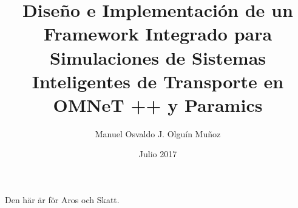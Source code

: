 \documentclass[upright, contnum]{umemoria}
\author{Manuel Osvaldo J. Olguín Muñoz}
\title{Diseño e Implementación de un Framework Integrado para Simulaciones de Sistemas Inteligentes de Transporte en OMNeT ++ y Paramics}
\date{Julio 2017}
\begin{document}
\frontmatter
\maketitle

\begin{abstract}
\lipsum[1-4]
\end{abstract}

\begin{dedicatoria}
Den här är för Aros och Skatt.
\end{dedicatoria}

\begin{thanks}
\lipsum[1-2]
\end{thanks}

\cleardoublepage
\tableofcontents
\cleardoublepage
\listoftables
\cleardoublepage
\listoffigures

\mainmatter





\blankpage
\cleardoublepage
\begin{multicols*}{2}[\printbibheading]
    \printbibliography[heading=none]
\end{multicols*}

\appendix

\end{document}
